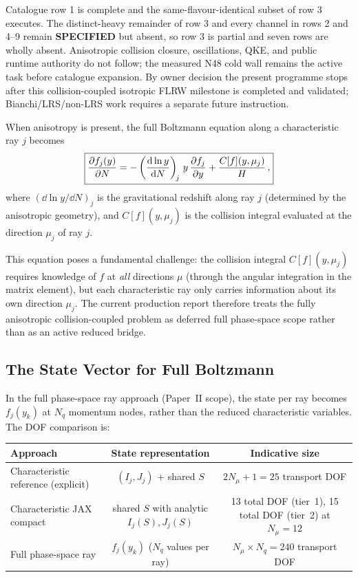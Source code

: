 Catalogue row 1 is complete and the same-flavour-identical subset of row 3
executes.  The distinct-heavy remainder of row 3 and every channel in rows 2
and 4--9 remain \textbf{SPECIFIED} but absent, so row 3 is partial and seven
rows are wholly absent.  Anisotropic collision closure, oscillations, QKE,
and public runtime authority do not follow; the measured N48 cold wall remains
the active task before catalogue expansion.  By owner decision the present
programme stops after this collision-coupled isotropic FLRW milestone is
completed and validated; Bianchi/LRS/non-LRS work requires a separate future
instruction.

When anisotropy is present, the full Boltzmann equation along a characteristic ray $j$ becomes
\begin{equation}
\boxed{\frac{\partial f_j(y)}{\partial N} = -\left(\frac{\mathrm{d}\ln y}{\mathrm{d} N}\right)_{\!j}\,y\,\frac{\partial f_j}{\partial y} + \frac{C[f](y, \mu_j)}{H}\,,}\label{eq:boltzmann_char_coll}
\end{equation}
where $(\dd\ln y/\dd N)_j$ is the gravitational redshift along ray $j$ (determined by the anisotropic geometry), and $C[f](y, \mu_j)$ is the collision integral evaluated at the direction $\mu_j$ of ray $j$.

This equation poses a fundamental challenge: the collision integral $C[f](y, \mu_j)$ requires knowledge of $f$ at \emph{all} directions $\mu$ (through the angular integration in the matrix element), but each characteristic ray only carries information about its own direction $\mu_j$.  The current production report therefore treats the fully anisotropic collision-coupled problem as deferred full phase-space scope rather than as an active reduced bridge.

\subsection{The State Vector for Full Boltzmann}

In the full phase-space ray approach (Paper~II scope), the state per ray becomes $f_j(y_k)$ at $N_q$ momentum nodes, rather than the reduced characteristic variables.  The DOF comparison is:

\begin{center}
\begin{tabular}{lcc}
\toprule
Approach & State representation & Indicative size \\
\midrule
Characteristic reference (explicit) & $(I_j, J_j)$ + shared $S$ & $2N_\mu + 1 = 25$ transport DOF \\
Characteristic JAX compact & shared $S$ with analytic $I_j(S), J_j(S)$ & 13 total DOF (tier~1), 15 total DOF (tier~2) at $N_\mu=12$ \\
Full phase-space ray & $f_j(y_k)$ ($N_q$ values per ray) & $N_\mu \times N_q = 240$ transport DOF \\
\bottomrule
\end{tabular}
\end{center}

